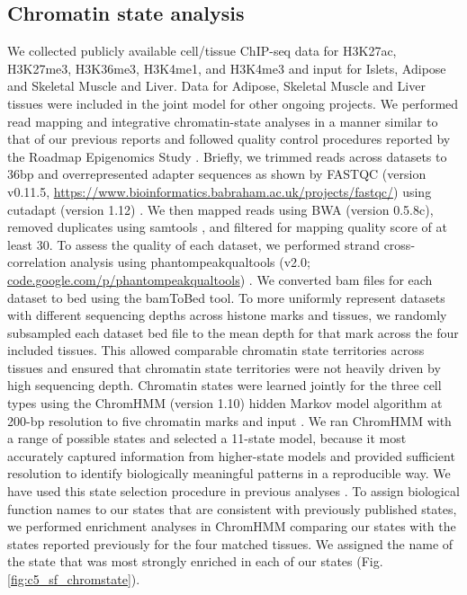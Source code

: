 \subsection{Chromatin state analysis}
We collected publicly available cell/tissue ChIP-seq data for H3K27ac, H3K27me3, H3K36me3, H3K4me1, and H3K4me3 and input for Islets, Adipose and Skeletal Muscle and Liver. Data for Adipose, Skeletal Muscle and Liver tissues were included in the joint model for other ongoing projects. We performed read mapping and integrative chromatin-state analyses in a manner similar to that of our previous reports  and followed quality control procedures reported by the Roadmap Epigenomics Study \cite{theroadmapepigenomicsconsortiumIntegrativeAnalysis1112015}. Briefly, we trimmed reads across datasets to 36bp and overrepresented adapter sequences as shown by FASTQC (version v0.11.5, \url{https://www.bioinformatics.babraham.ac.uk/projects/fastqc/}) using cutadapt (version 1.12) \cite{martinCutadaptRemovesAdapter2011}. We then mapped reads using BWA (version 0.5.8c), removed duplicates using samtools \cite{liSequenceAlignmentMap2009}, and filtered for mapping quality score of at least 30. To assess the quality of each dataset, we performed strand cross-correlation analysis using phantompeakqualtools (v2.0; \url{code.google.com/p/phantompeakqualtools}) \cite{landtChIPseqGuidelinesPractices2012}. We converted bam files for each dataset to bed using the bamToBed tool. To more uniformly represent datasets with different sequencing depths across histone marks and tissues, we randomly subsampled each dataset bed file to the mean depth for that mark across the four included tissues. This allowed comparable chromatin state territories across tissues and ensured that chromatin state territories were not heavily driven by high sequencing depth. Chromatin states were learned jointly for the three cell types using the ChromHMM (version 1.10) hidden Markov model algorithm at 200-bp resolution to five chromatin marks and input \cite{ernstDiscoveryCharacterizationChromatin2010, ernstMappingAnalysisChromatin2011, ernstChromHMMAutomatingChromatin2012}. We ran ChromHMM with a range of possible states and selected a 11-state model, because it most accurately captured information from higher-state models and provided sufficient resolution to identify biologically meaningful patterns in a reproducible way. We have used this state selection procedure in previous analyses \cite{scottGeneticRegulatorySignature2016, varshneyGeneticRegulatorySignatures2017}. To assign biological function names to our states that are consistent with previously published states, we performed enrichment analyses in ChromHMM comparing our states with the states reported previously \cite{varshneyGeneticRegulatorySignatures2017} for the four matched tissues. We assigned the name of the state that was most strongly enriched in each of our states (Fig. \ref{fig:c5_sf_chromstate}).                 
                
